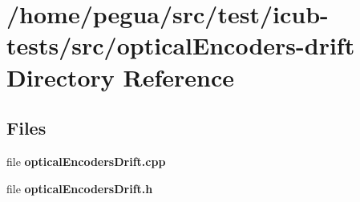 \section{/home/pegua/src/test/icub-\/tests/src/optical\-Encoders-\/drift Directory Reference}
\label{dir_7f61241abd7fbdf9954805296c6d0bed}
\subsection*{Files}
\begin{DoxyCompactItemize}
\item 
file {\bfseries optical\-Encoders\-Drift.\-cpp}
\item 
file {\bfseries optical\-Encoders\-Drift.\-h}
\end{DoxyCompactItemize}
